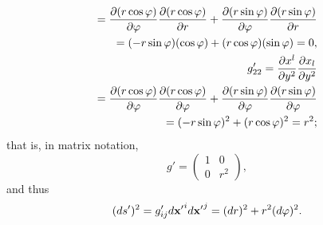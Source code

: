 {\begin{equation}
\begin{split}
=
{\partial (r \cos \varphi) \over \partial {\varphi }}{\partial (r \cos \varphi) \over \partial {r}}
+
{\partial (r \sin \varphi) \over \partial {\varphi }}{\partial (r \sin \varphi) \over \partial {r}}   \\
=
(- r \sin \varphi ) ( \cos \varphi )
+
( r\cos  \varphi )( \sin \varphi )  =0,\\
g'_{22}
= {\partial {x}^l\over \partial { y }^2}{\partial {x}_l\over \partial { y }^2} \\
=
{\partial (r \cos \varphi) \over \partial {\varphi}}{\partial (r \cos \varphi) \over \partial {\varphi }}
+
{\partial (r \sin \varphi) \over \partial {\varphi}}{\partial (r \sin \varphi) \over \partial {\varphi }}      \\
=
(- r \sin \varphi )^2
+
( r \cos \varphi )^2  =r^2;
\end{split}
\label{2018-mm-ch-tensor-gijpola}
\end{equation}
that is, in matrix notation,
\begin{equation}
g'
=
\begin{pmatrix}
1&0\\
0&r^2
\end{pmatrix}
,
\end{equation}
and thus
\begin{equation}
(d s')^2  = g_{ij}'d{\bf x'}^i d{\bf x'}^j=   (dr)^2 + r^2 (d\varphi )^2.
\label{2014-gppolarc}
\end{equation}







}
